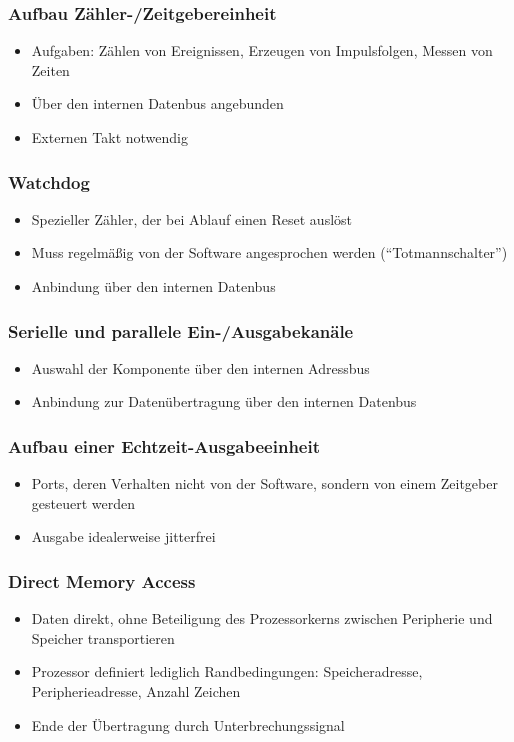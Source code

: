 \subsubsection{Aufbau Zähler-/Zeitgebereinheit}
\begin{itemize}
	\item Aufgaben: Zählen von Ereignissen, Erzeugen von Impulsfolgen, Messen von Zeiten
	\item Über den internen Datenbus angebunden
	\item Externen Takt notwendig
\end{itemize}

\subsubsection{Watchdog}
\begin{itemize}
	\item Spezieller Zähler, der bei Ablauf einen Reset auslöst
	\item Muss regelmäßig von der Software angesprochen werden ("`Totmannschalter"')
	\item Anbindung über den internen Datenbus
\end{itemize}

\subsubsection{Serielle und parallele Ein-/Ausgabekanäle}
\begin{itemize}
	\item Auswahl der Komponente über den internen Adressbus
	\item Anbindung zur Datenübertragung über den internen Datenbus
\end{itemize}

\subsubsection{Aufbau einer Echtzeit-Ausgabeeinheit}
\begin{itemize}
	\item Ports, deren Verhalten nicht von der Software, sondern von einem Zeitgeber gesteuert werden
	\item Ausgabe idealerweise jitterfrei
\end{itemize}

\subsubsection{Direct Memory Access}
\begin{itemize}
	\item Daten direkt, ohne Beteiligung des Prozessorkerns zwischen Peripherie und Speicher transportieren
	\item Prozessor definiert lediglich Randbedingungen: Speicheradresse, Peripherieadresse, Anzahl Zeichen
	\item Ende der Übertragung durch Unterbrechungssignal
\end{itemize}


